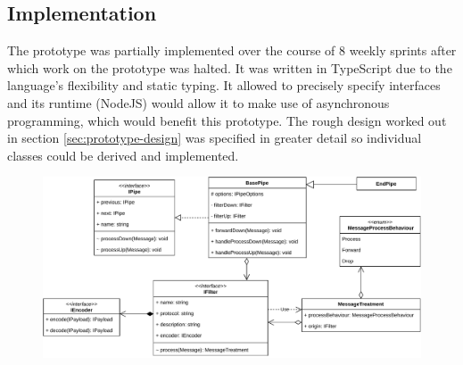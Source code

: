\subsection{Implementation}
\label{sec:prototype-implementation}
The prototype was partially implemented over the course of 8%
weekly sprints after which work on the prototype was halted. It was written in TypeScript due to the language's flexibility and static typing. It allowed to precisely specify interfaces and its runtime (NodeJS) would allow it to make use of asynchronous programming, which would benefit this prototype. The rough design worked out in section \ref{sec:prototype-design} was specified in greater detail so individual classes could be derived and implemented.\par
\begin{figure}[h]
    \centering
    \includegraphics[width=14cm]{img/ch04/prototype/pipe-filter.pdf}
    \label{fig:prototype-pipe-filter}
\end{figure}
